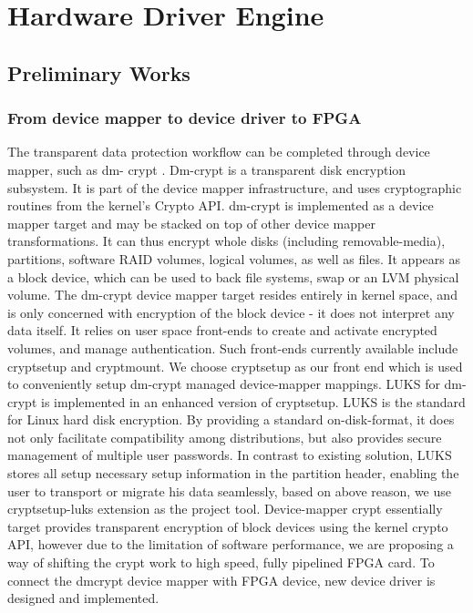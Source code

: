 \documentclass[10pt]{report}
\begin{document}
	\chapter{Hardware Driver Engine}
		\section{Preliminary Works}
			\subsection{From device mapper to device driver to FPGA}
			The transparent data protection workflow can be completed through device mapper, such as dm- crypt \cite{4,5}. Dm-crypt is a transparent disk encryption subsystem. It is part of the device mapper infrastructure, and uses cryptographic routines from the kernel's Crypto API. dm-crypt is implemented as a device mapper target and may be stacked on top of other device mapper transformations. It can thus encrypt whole disks (including removable-media), partitions, software RAID volumes, logical volumes, as well as files. It appears as a block device, which can be used to back file systems, swap or an LVM physical volume.
			The dm-crypt device mapper target resides entirely in kernel space, and is only concerned with encryption of the block device - it does not interpret any data itself. It relies on user space front-ends to create and activate encrypted volumes, and manage authentication. Such front-ends currently available include cryptsetup and cryptmount. We choose cryptsetup as our front end which is used to conveniently setup dm-crypt managed device-mapper mappings. LUKS \cite{5} for dm-crypt is implemented in an enhanced version of cryptsetup. LUKS is the standard for Linux hard disk encryption. By providing a standard on-disk-format, it does not only facilitate compatibility among distributions, but also provides secure management of multiple user passwords. In contrast to existing solution, LUKS stores all setup necessary setup information in the partition header, enabling the user to transport or migrate his data seamlessly, based on above reason, we use cryptsetup-luks extension as the project tool.
			Device-mapper crypt essentially target provides transparent encryption of block devices using the kernel crypto API, however due to the limitation of software performance, we are proposing a way of shifting the crypt work to high speed, fully pipelined FPGA card. To connect the dmcrypt device mapper with FPGA device, new device driver is designed and implemented.
\end{document}
